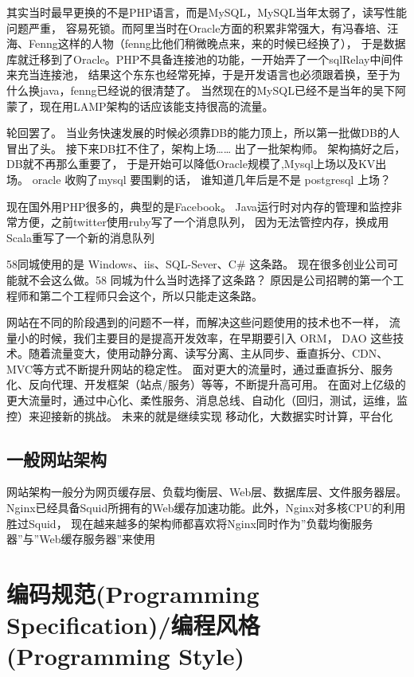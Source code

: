 \documentclass{book}
\begin{document}
其实当时最早更换的不是PHP语言，而是MySQL，MySQL当年太弱了，读写性能问题严重，
容易死锁。而阿里当时在Oracle方面的积累非常强大，有冯春培、汪海、Fenng这样的人物（fenng比他们稍微晚点来，来的时候已经换了），
于是数据库就迁移到了Oracle。PHP不具备连接池的功能，一开始弄了一个sqlRelay中间件来充当连接池，
结果这个东东也经常死掉，于是开发语言也必须跟着换，至于为什么换java，fenng已经说的很清楚了。 
当然现在的MySQL已经不是当年的吴下阿蒙了，现在用LAMP架构的话应该能支持很高的流量。

轮回罢了。 当业务快速发展的时候必须靠DB的能力顶上，所以第一批做DB的人冒出了头。 
接下来DB扛不住了，架构上场…… 出了一批架构师。 架构搞好之后，DB就不再那么重要了，
于是开始可以降低Oracle规模了,Mysql上场以及KV出场。 oracle 收购了mysql 要围剿的话，
谁知道几年后是不是 postgresql 上场？

现在国外用PHP很多的，典型的是Facebook。 Java运行时对内存的管理和监控非常方便，之前twitter使用ruby写了一个消息队列，
因为无法管控内存，换成用Scala重写了一个新的消息队列

58同城使用的是 Windows、iis、SQL-Sever、C\# 这条路。
现在很多创业公司可能就不会这么做。58 同城为什么当时选择了这条路？
原因是公司招聘的第一个工程师和第二个工程师只会这个，所以只能走这条路。

网站在不同的阶段遇到的问题不一样，而解决这些问题使用的技术也不一样，
流量小的时候，我们主要目的是提高开发效率，在早期要引入 ORM，
DAO 这些技术。随着流量变大，使用动静分离、读写分离、主从同步、垂直拆分、CDN、MVC等方式不断提升网站的稳定性。
面对更大的流量时，通过垂直拆分、服务化、反向代理、开发框架（站点/服务）等等，不断提升高可用。
在面对上亿级的更大流量时，通过中心化、柔性服务、消息总线、自动化（回归，测试，运维，监控）来迎接新的挑战。
未来的就是继续实现 移动化，大数据实时计算，平台化

\subsection{一般网站架构}

网站架构一般分为网页缓存层、负载均衡层、Web层、数据库层、文件服务器层。
Nginx已经具备Squid所拥有的Web缓存加速功能。此外，Nginx对多核CPU的利用胜过Squid，
现在越来越多的架构师都喜欢将Nginx同时作为”负载均衡服务器”与”Web缓存服务器”来使用




\section{编码规范(Programming Specification)/编程风格(Programming Style)}
\end{document}

